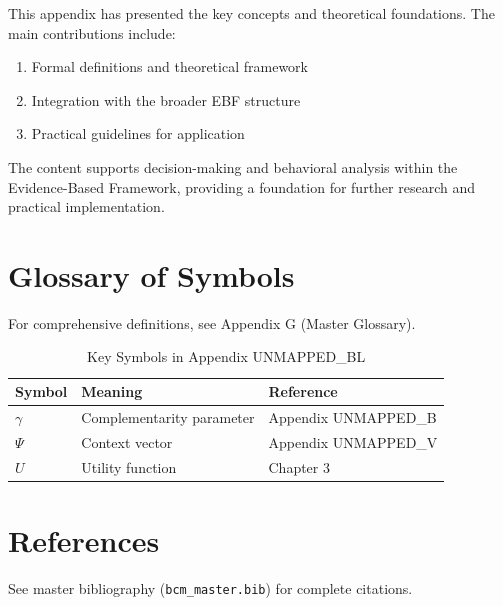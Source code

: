 This appendix has presented the key concepts and theoretical foundations.
The main contributions include:

\begin{enumerate}
    \item Formal definitions and theoretical framework
    \item Integration with the broader EBF structure
    \item Practical guidelines for application
\end{enumerate}

The content supports decision-making and behavioral analysis within the
Evidence-Based Framework, providing a foundation for further research
and practical implementation.


\section{Glossary of Symbols}
\label{sec:bl-glossary}

For comprehensive definitions, see Appendix G (Master Glossary).

\begin{table}[htbp]
\centering
\caption{Key Symbols in Appendix UNMAPPED_BL}
\begin{tabular}{lll}
\toprule
\textbf{Symbol} & \textbf{Meaning} & \textbf{Reference} \\
\midrule
$\gamma$ & Complementarity parameter & Appendix UNMAPPED_B \\
$\Psi$ & Context vector & Appendix UNMAPPED_V \\
$U$ & Utility function & Chapter 3 \\
\bottomrule
\end{tabular}
\end{table}


\section{References}
\label{sec:references}

See master bibliography (\texttt{bcm\_master.bib}) for complete citations.

\nocite{bcm_master}

